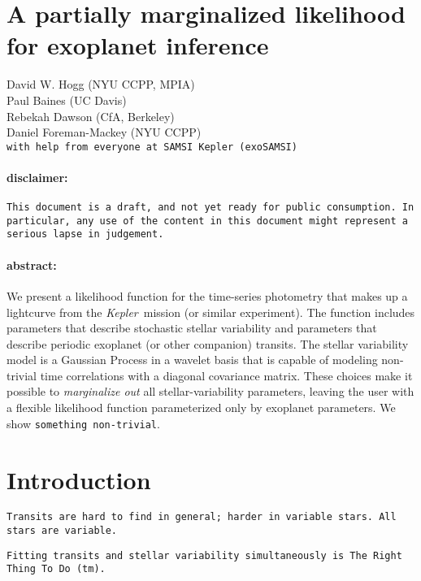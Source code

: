 \documentclass[12pt,letterpaper]{article}
\newcommand{\warning}[1]{\texttt{#1}}
\newcommand{\project}[1]{\textsl{#1}}
\newcommand{\Kepler}{\project{Kepler}}
\begin{document}
\sloppy\sloppypar

\section*{A partially marginalized likelihood\\
          for exoplanet inference}

\noindent
David W. Hogg (NYU CCPP, MPIA) \\
Paul Baines (UC Davis) \\
Rebekah Dawson (CfA, Berkeley) \\
Daniel Foreman-Mackey (NYU CCPP) \\
\warning{with help from everyone at SAMSI Kepler (exoSAMSI)}

\paragraph{disclaimer:}
\warning{This document is a draft, and not yet ready for public consumption.
In particular, any use of the content in this document might represent a serious lapse in judgement.}

\paragraph{abstract:}
We present a likelihood function for the time-series photometry
that makes up a lightcurve from the \Kepler\ mission (or similar experiment).
The function includes parameters that describe stochastic stellar variability
and parameters that describe periodic exoplanet (or other companion) transits.
The stellar variability model is a Gaussian Process in a wavelet basis
that is capable of modeling non-trivial time correlations with a diagonal covariance matrix.
These choices make it possible to \emph{marginalize out} all stellar-variability parameters,
leaving the user with a flexible likelihood function parameterized only by exoplanet parameters.
We show \warning{something non-trivial}.

\section{Introduction}

\warning{Transits are hard to find in general; harder in variable stars.  All stars are variable.}

\warning{Fitting transits and stellar variability simultaneously is The Right Thing To Do~(tm).}
\end{document}
